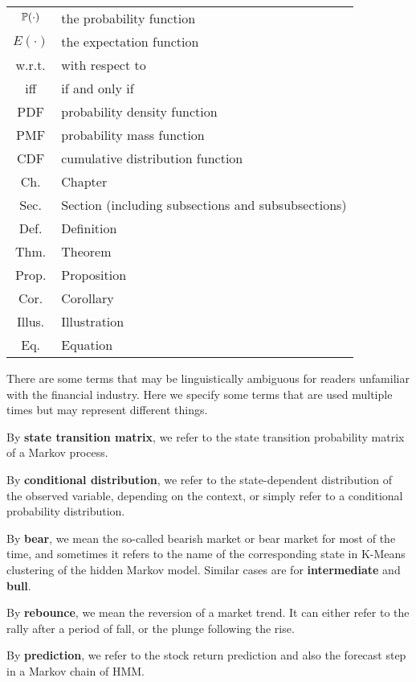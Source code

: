 \begin{table}[!hbt]
\begin{tabular}{c p{25em}}
		$\mathbb{P}(\cdot)$	&	the probability function	\\	
		$E(\cdot)$	&	the expectation function	\\	
		w.r.t.	&	with respect to	\\	
		iff	&	if and only if	\\	
		PDF & 	probability density function	\\
		PMF & 	probability mass function	\\
		CDF & 	cumulative distribution function	\\
		Ch.	&	Chapter	\\	
		Sec.	&	Section (including subsections and subsubsections)	\\	
		Def.	&	Definition	\\
		Thm.	&	Theorem	\\	
		Prop.	&	Proposition	\\	
		Cor.	&	Corollary	\\
		Illus.	&	Illustration	\\	
		Eq.	&	Equation	\\	
        \hline
        \end{tabular}
        \end{table}

There are some terms that may be linguistically ambiguous 
for readers unfamiliar with the financial industry.
Here we specify some terms that are used multiple times but may represent different things.

By \textbf{state transition matrix}, we refer to the state transition probability matrix
of a Markov process.

By \textbf{conditional distribution}, we refer to the state-dependent distribution of 
the observed variable, depending on the context,
or simply refer to a conditional probability distribution.

By \textbf{bear}, we mean the so-called bearish market or bear market for most of the time,
and sometimes it refers to the name of the corresponding state 
in K-Means clustering of the hidden Markov model.
Similar cases are for \textbf{intermediate} and \textbf{bull}.

By \textbf{rebounce}, we mean the reversion of a market trend.
It can either refer to the rally after a period of fall,
or the plunge following the rise.

By \textbf{prediction}, we refer to the stock return prediction and also
the forecast step in a Markov chain of HMM.